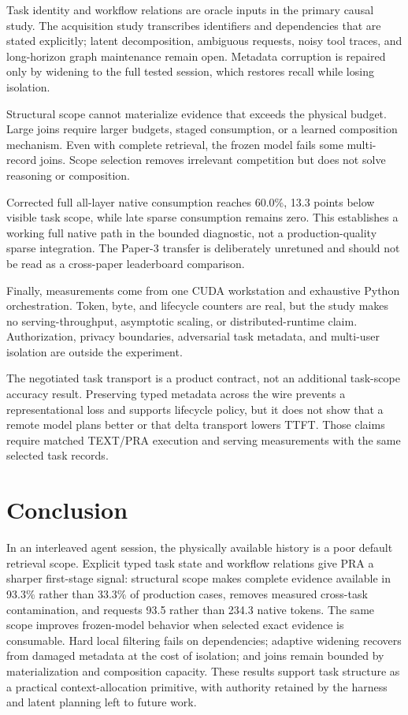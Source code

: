 \documentclass[10pt]{article}
\begin{document}
Task identity and workflow relations are oracle inputs in the primary causal study. The acquisition study transcribes identifiers and dependencies that are stated explicitly; latent decomposition, ambiguous requests, noisy tool traces, and long-horizon graph maintenance remain open. Metadata corruption is repaired only by widening to the full tested session, which restores recall while losing isolation.

Structural scope cannot materialize evidence that exceeds the physical budget. Large joins require larger budgets, staged consumption, or a learned composition mechanism. Even with complete retrieval, the frozen model fails some multi-record joins. Scope selection removes irrelevant competition but does not solve reasoning or composition.

Corrected full all-layer native consumption reaches 60.0\%, 13.3 points below visible task scope, while late sparse consumption remains zero. This establishes a working full native path in the bounded diagnostic, not a production-quality sparse integration. The Paper-3 transfer is deliberately unretuned and should not be read as a cross-paper leaderboard comparison.

Finally, measurements come from one CUDA workstation and exhaustive Python orchestration. Token, byte, and lifecycle counters are real, but the study makes no serving-throughput, asymptotic scaling, or distributed-runtime claim. Authorization, privacy boundaries, adversarial task metadata, and multi-user isolation are outside the experiment.

The negotiated task transport is a product contract, not an additional
task-scope accuracy result. Preserving typed metadata across the wire prevents
a representational loss and supports lifecycle policy, but it does not show
that a remote model plans better or that delta transport lowers TTFT. Those
claims require matched TEXT/PRA execution and serving measurements with the
same selected task records.

\section{Conclusion}
In an interleaved agent session, the physically available history is a poor default retrieval scope. Explicit typed task state and workflow relations give PRA a sharper first-stage signal: structural scope makes complete evidence available in 93.3\% rather than 33.3\% of production cases, removes measured cross-task contamination, and requests 93.5 rather than 234.3 native tokens. The same scope improves frozen-model behavior when selected exact evidence is consumable. Hard local filtering fails on dependencies; adaptive widening recovers from damaged metadata at the cost of isolation; and joins remain bounded by materialization and composition capacity. These results support task structure as a practical context-allocation primitive, with authority retained by the harness and latent planning left to future work.
\end{document}
